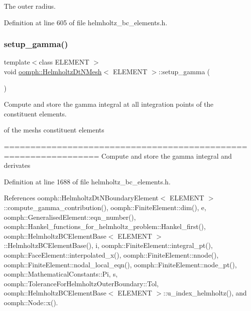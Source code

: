 The outer radius. 



Definition at line 605 of file helmholtz\+\_\+bc\+\_\+elements.\+h.

\mbox{\label{classoomph_1_1HelmholtzDtNMesh_a6ff3552cd1d0ba3f29b4fe951e3f0ed5}} 
\subsubsection{\texorpdfstring{setup\+\_\+gamma()}{setup\_gamma()}}
{\footnotesize\ttfamily template$<$class E\+L\+E\+M\+E\+NT $>$ \\
void \hyperlink{classoomph_1_1HelmholtzDtNMesh}{oomph\+::\+Helmholtz\+Dt\+N\+Mesh}$<$ E\+L\+E\+M\+E\+NT $>$\+::setup\+\_\+gamma (\begin{DoxyParamCaption}{ }\end{DoxyParamCaption})}



Compute and store the gamma integral at all integration points of the constituent elements. 

of the mesh\textquotesingle{}s constituent elements

================================================================ Compute and store the gamma integral and derivates 

Definition at line 1688 of file helmholtz\+\_\+bc\+\_\+elements.\+h.



References oomph\+::\+Helmholtz\+Dt\+N\+Boundary\+Element$<$ E\+L\+E\+M\+E\+N\+T $>$\+::compute\+\_\+gamma\+\_\+contribution(), oomph\+::\+Finite\+Element\+::dim(), e, oomph\+::\+Generalised\+Element\+::eqn\+\_\+number(), oomph\+::\+Hankel\+\_\+functions\+\_\+for\+\_\+helmholtz\+\_\+problem\+::\+Hankel\+\_\+first(), oomph\+::\+Helmholtz\+B\+C\+Element\+Base$<$ E\+L\+E\+M\+E\+N\+T $>$\+::\+Helmholtz\+B\+C\+Element\+Base(), i, oomph\+::\+Finite\+Element\+::integral\+\_\+pt(), oomph\+::\+Face\+Element\+::interpolated\+\_\+x(), oomph\+::\+Finite\+Element\+::nnode(), oomph\+::\+Finite\+Element\+::nodal\+\_\+local\+\_\+eqn(), oomph\+::\+Finite\+Element\+::node\+\_\+pt(), oomph\+::\+Mathematical\+Constants\+::\+Pi, s, oomph\+::\+Tolerance\+For\+Helmholtz\+Outer\+Boundary\+::\+Tol, oomph\+::\+Helmholtz\+B\+C\+Element\+Base$<$ E\+L\+E\+M\+E\+N\+T $>$\+::u\+\_\+index\+\_\+helmholtz(), and oomph\+::\+Node\+::x().



